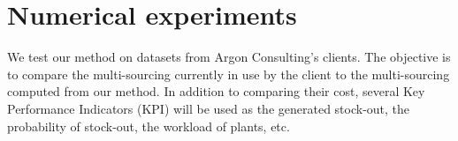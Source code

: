 \chapter{Numerical experiments}
\label{chap:multi-sourcing:numerical-experiments}


We test our method on datasets from Argon Consulting’s clients.
The objective is to compare the multi-sourcing currently in use by the client to the multi-sourcing computed from our method.
In addition to comparing their cost, several Key Performance Indicators (KPI) will be used as the generated stock-out, the probability of stock-out, the workload of plants, etc.












